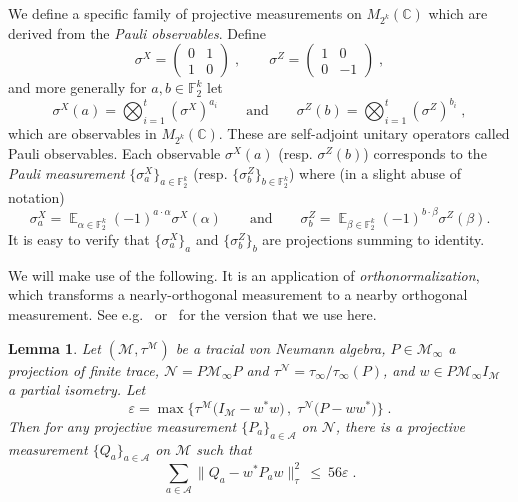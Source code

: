 \documentclass[11pt]{article}
\newtheorem{lemma}[theorem]{Lemma}
\theoremstyle{definition}
\newcommand{\Id}{\ensuremath{I}}
\DeclareMathOperator*{\Expectation}{\mathbb{E}}
\newcommand{\Es}[1]{\Expectation_{#1}}
\newcommand{\C}{\ensuremath{\mathbb{C}}}
\newcommand{\F}{\ensuremath{\mathbb{F}}}
\newcommand{\mA}{\ensuremath{\mathcal{A}}}
\newcommand{\mM}{\ensuremath{\mathcal{M}}}
\newcommand{\eps}{\varepsilon}
\newcommand{\mN}{\mathcal{N}}
\begin{document}
	We define a specific family of projective measurements on $M_{2^k}(\C)$ which are derived from the \emph{Pauli observables}. Define
	\begin{equation}\label{eq:def-pauli-1} \sigma^X = \begin{pmatrix} 0 & 1 \\ 1 & 0 \end{pmatrix}\;,\qquad \sigma^Z = \begin{pmatrix} 1 & 0 \\ 0 & -1\end{pmatrix}\;,
	\end{equation}
	and more generally for $a,b\in \F_2^k$ let 
	\begin{equation}\label{eq:def-pauli-2}
	\sigma^X(a) = \bigotimes_{i=1}^t (\sigma^X)^{a_i}\qquad\text{and}\qquad\sigma^Z(b) = \bigotimes_{i=1}^t (\sigma^Z)^{b_i}\;,
	\end{equation}
	which are observables in $M_{2^k}(\C)$. These are self-adjoint unitary operators called Pauli observables. Each observable $\sigma^X(a)$ (resp. $\sigma^Z(b)$) corresponds to the \emph{Pauli measurement} $\{ \sigma^X_a \}_{a \in \F_2^k}$ (resp. $\{ \sigma^Z_b \}_{b \in \F_2^k}$) where (in a slight abuse of notation)  
	\[ \sigma^X_a = \Es{\alpha\in\F_2^k} (-1)^{a\cdot \alpha} \sigma^X(\alpha)\qquad\text{and}\qquad\sigma^Z_b = \Es{\beta\in\F_2^k} (-1)^{b\cdot\beta} \sigma^Z(\beta).\]
	It is easy to verify that $\{\sigma^X_a\}_a$ and $\{\sigma^Z_b\}_b$ are projections summing to identity.	
	
	
	We will make use of the following. It is an application of \emph{orthonormalization}, which transforms a nearly-orthogonal measurement to a nearby orthogonal measurement. See e.g.~\cite{kempe2011parallel,ji2020quantum} or~\cite[Theorem 1.2]{de2021orthogonalization} for the version that we use here. 
	
\begin{lemma}\label{lem:pull-back}
Let  $(\mM,\tau^\mM)$ be a tracial von Neumann algebra, $P\in\mM_\infty$ a projection of finite trace, $\mN=P\mM_\infty P$ and $\tau^\mN=\tau_\infty/\tau_\infty(P)$, and $w\in P \mM_\infty \Id_\mM$ a partial isometry.  Let 
\[ \eps = \max\big\{ \tau^\mM\big(\Id_\mM - w^* w\big)\,,\;\tau^\mN\big( P- w w^*\big)\big\}\;.\] 
 Then for any projective measurement $\{P_a\}_{a \in \mA}$ on $\mN$, there is a projective measurement $\{Q_a\}_{a \in \mA}$ on $\mM$ such that 
\begin{equation}
\label{eq:pull-back} \sum_{a \in \mA} \big\| Q_a - w^* P_a w\big\|_\tau^2 \,\leq \ 56\eps\;.
\end{equation}
\end{lemma}	
\end{document}
